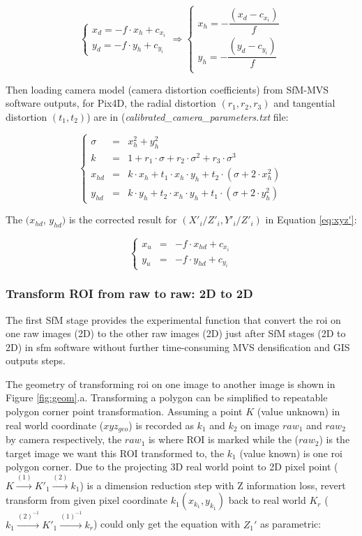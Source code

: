 \documentclass[doublespacing]{configs/bmcart}
\begin{document}
$$
\begin{cases}
  x_d = - f \cdot x_h + c_{x_i} \\
  y_d = - f \cdot y_h + c_{y_i}
\end{cases}
\Rightarrow
\begin{cases}
  x_h  = - \dfrac{(x_d - c_{x_i})}{f} \\
  y_h  = - \dfrac{(y_d - c_{y_i})}{f} \\
\end{cases}
$$

Then loading camera model (camera distortion coefficients) from SfM-MVS software outputs, for Pix4D, the radial distortion $(r_1, r_2, r_3)$ and tangential distortion $(t_1, t_2)$) are in (\textit{calibrated\_camera\_parameters.txt} file:

$$
  \left\{\begin{array}{lll}
    \sigma & = & x_h^2 + y_h^2 \\
    k      & = & 1 + r_1 \cdot \sigma + r_2 \cdot \sigma^2 + r_3 \cdot \sigma^3 \\
    x_{hd} & = & k \cdot x_h + t_1 \cdot x_h \cdot y_h + t_2 \cdot (\sigma + 2 \cdot x_h^2) \\
    y_{hd} & = & k \cdot y_h + t_2 \cdot x_h \cdot y_h + t_1 \cdot (\sigma + 2 \cdot y_h^2)
  \end{array} \right. \nonumber
$$

The $(x_{hd}$, $y_{hd})$ is the corrected result for $(X'_i / Z'_i, Y'_i / Z'_i)$ in Equation \ref{eq:xyz'}:

$$
\left\{
  \begin{array}{lll}
    x_u & = & - f \cdot x_{hd} + c_{x_i} \\
    y_u & = & - f \cdot y_{hd} + c_{y_i}
  \end{array} 
\right.
$$

\subsubsection*{Transform ROI from raw to raw: 2D to 2D}
The first SfM stage provides the experimental function that convert the \acrshort*{roi} on one raw images (2D) to the other raw images (2D) just after SfM stages (2D to 2D) in \acrshort*{sfm} software without further time-consuming MVS densification and GIS outputs steps.

The geometry of transforming \acrshort*{roi} on one image to another image is shown in Figure \ref{fig:geom}.a. Transforming a polygon can be simplified to repeatable polygon corner point transformation. Assuming a point $K$ (value unknown) in real world coordinate ($xyz_{geo}$) is recorded as $k_1$ and $k_2$ on image $raw_1$ and $raw_2$ by camera respectively, the $raw_1$ is where ROI is marked while the ($raw_2$) is the target image we want this ROI transformed to, the $k_1$ (value known) is one \acrshort*{roi} polygon corner. Due to the projecting 3D real world point to 2D pixel point ($K \xrightarrow{(1)} K'_1 \xrightarrow{(2)} k_1$) is a dimension reduction step with Z information loss, revert transform from given pixel coordinate $k_1 (x_{k_1}, y_{k_1})$ back to real world $K_r$ ($k_1 \xrightarrow{(2)^{-1}} K'_1 \xrightarrow{(1)^{-1}} k_r$) could only get the equation with $Z_1'$ as parametric:
\end{document}
